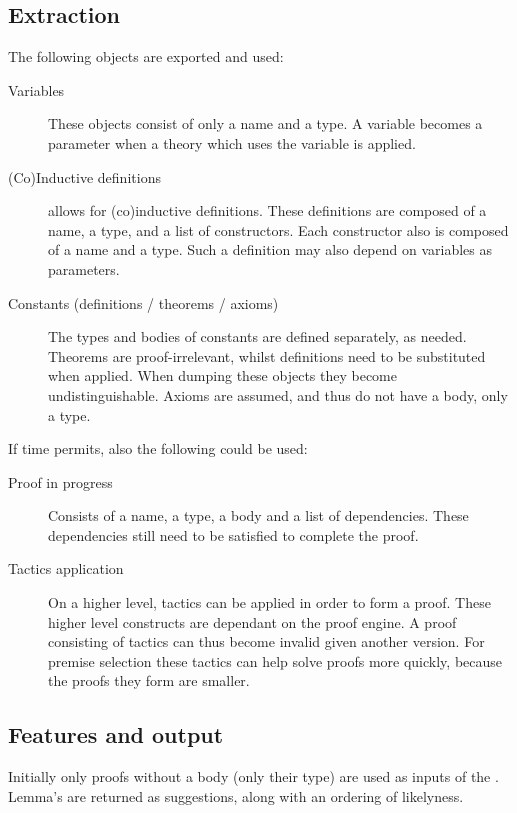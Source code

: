 \subsection{Extraction}
The following \coq objects are exported and used:
\begin{description}
    \item[Variables]
        These objects consist of only a name and a type.
        A variable becomes a parameter when a theory which uses the variable is applied.
    
    \item[(Co)Inductive definitions]
        \coq allows for (co)inductive definitions.
        These definitions are composed of a name, a type, and a list of constructors.
        Each constructor also is composed of a name and a type.
        Such a definition may also depend on variables as parameters.

    \item[Constants (definitions / theorems / axioms)]
        The types and bodies of constants are defined separately, as needed.
        Theorems are proof-irrelevant, whilst definitions need to be substituted when applied.
        When dumping these objects they become undistinguishable.
        Axioms are assumed, and thus do not have a body, only a type.
\end{description}

If time permits, also the following could be used:
\begin{description}
    \item[Proof in progress]
        Consists of a name, a type, a body and a list of dependencies.
        These dependencies still need to be satisfied to complete the proof.
    \item[Tactics application]
        On a higher level, tactics can be applied in order to form a proof.
        These higher level constructs are dependant on the proof engine.
        A proof consisting of tactics can thus become invalid given another \coq version.
        For premise selection these tactics can help solve proofs more quickly, because the proofs they form are smaller.
\end{description}

\subsection{Features and output}
Initially only proofs without a body (only their type) are used as inputs of the \premiseselection.
Lemma's are returned as suggestions, along with an ordering of likelyness.

